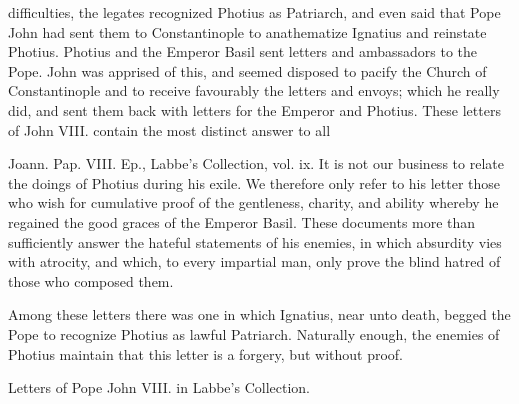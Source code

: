difficulties, the legates recognized Photius as Patriarch, and even said that Pope John had sent them to Constantinople to anathematize Ignatius and reinstate Photius. Photius and the Emperor Basil sent letters and ambassadors to the Pope. John was apprised of this, and seemed disposed to pacify the Church of Constantinople and to receive favourably the letters and envoys; which he really did, and sent them back with letters for the Emperor and Photius. These letters of John VIII. contain the most distinct answer to all

Joann. Pap. VIII. Ep., Labbe’s Collection, vol. ix. It is not our business to relate the doings of Photius during his exile. We therefore only refer to his letter those who wish for cumulative proof of the gentleness, charity, and ability whereby he regained the good graces of the Emperor Basil. These documents more than sufficiently answer the hateful statements of his enemies, in which absurdity vies with atrocity, and which, to every impartial man, only prove the blind hatred of those who composed them.

Among these letters there was one in which Ignatius, near unto death, begged the Pope to recognize Photius as lawful Patriarch. Naturally enough, the enemies of Photius maintain that this letter is a forgery, but without proof.

Letters of Pope John VIII. in Labbe’s Collection.


